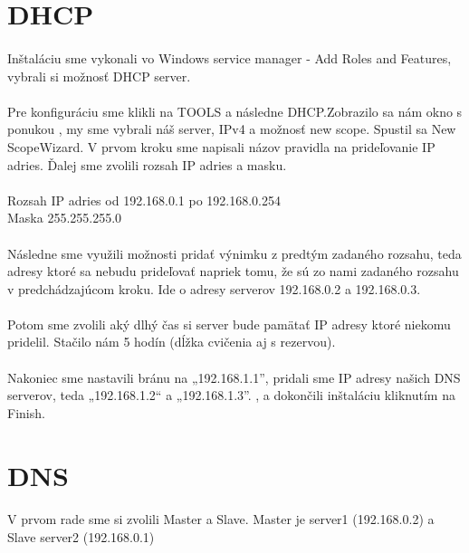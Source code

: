 \section{DHCP}
\paragraph{}
Inštaláciu sme vykonali vo Windows service manager - Add Roles and Features, vybrali si možnosť DHCP server.
\paragraph{}
Pre konfiguráciu sme klikli na TOOLS a následne DHCP.Zobrazilo sa nám okno s ponukou , my sme vybrali náš server, IPv4 a možnosť new scope. Spustil sa New ScopeWizard. V prvom kroku  sme napisali názov pravidla na prideľovanie IP adries. Ďalej sme zvolili  rozsah IP adries a masku.
\\
\\
Rozsah IP adries od 192.168.0.1 po 192.168.0.254\\
Maska 255.255.255.0
\paragraph{}
Následne sme využili možnosti pridať výnimku z predtým zadaného rozsahu, teda adresy ktoré sa nebudu prideľovať napriek tomu, že sú zo nami  zadaného rozsahu v predchádzajúcom kroku. Ide o adresy serverov 192.168.0.2 a 192.168.0.3.
\paragraph{}
Potom  sme zvolili aký dlhý čas si server bude pamätať IP adresy ktoré niekomu pridelil. Stačilo nám 5 hodín (dĺžka cvičenia aj s rezervou).
\paragraph{}
Nakoniec sme nastavili bránu na „192.168.1.1”, pridali sme IP adresy našich DNS serverov, teda  „192.168.1.2“ a „192.168.1.3”. , a dokončili inštaláciu kliknutím na Finish.

\section{DNS}
\paragraph{}
V prvom rade sme si zvolili Master a Slave. Master je server1 (192.168.0.2) a Slave server2 (192.168.0.1)
